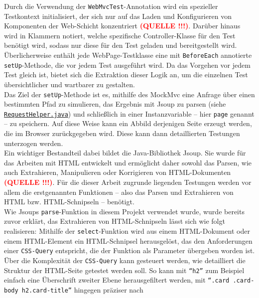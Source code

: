 Durch die Verwendung der \texttt{WebMvcTest}-Annotation wird ein spezieller 
Testkontext initialisiert, der sich nur auf das Laden und Konfigurieren von 
Komponenten der Web-Schicht konzentriert \textbf{\textcolor{red}{(QUELLE !!!)}}. 
Darüber hinaus wird in Klammern notiert, welche spezifische Controller-Klasse für 
den Test benötigt wird, sodass nur diese für den Test geladen und bereitgestellt 
wird. Überlicherweise enthält jede WebPage-Testklasse eine mit \texttt{BeforeEach} 
annotierte \texttt{setUp}-Methode, die vor jedem Test ausgeführt wird. Da das 
Vorgehen vor jedem Test gleich ist, bietet sich die Extraktion dieser Logik an, 
um die einzelnen Test übersichtlicher und wartbarer zu gestalten. \\ 
Das Ziel der \texttt{setUp}-Methode ist es, mithilfe des MockMvc eine Anfrage über 
einen bestimmten Pfad zu simulieren, das Ergebnis mit Jsoup zu parsen (siehe 
\href{https://github.com/FlorianOhmes/bat_spielzeitenplaner/blob/main/spielzeitenplaner/src/test/java/de/bathesis/spielzeitenplaner/utilities/RequestHelper.java}{\texttt{RequestHelper.java}}) und schließlich in einer 
Instanzvariable -- hier \texttt{page} genannt -- zu speichern. Auf diese Weise kann 
ein Abbild derjenigen Seite erzeugt werden, die im Browser zurückgegeben wird. 
Diese kann dann detaillierten Testungen unterzogen werden. \\ 
Ein wichtiger Bestandteil dabei bildet die Java-Bibliothek Jsoup. Sie wurde für das 
Arbeiten mit HTML entwickelt und ermöglicht daher sowohl das Parsen, wie auch 
Extrahieren, Manipulieren oder Korrigieren von HTML-Dokumenten 
\textbf{\textcolor{red}{(QUELLE !!!)}}. Für die dieser Arbeit zugrunde liegenden 
Testungen werden vor allem die erstgenannten Funktionen -- also das Parsen und 
Extrahieren von HTML bzw. HTML-Schnipseln -- benötigt. \\ 
Wie Jsoups \texttt{parse}-Funktion in diesem Projekt verwendet wurde, wurde bereits 
zuvor erklärt, das Extrahieren von HTML-Schnipseln lässt sich wie folgt 
realisieren: Mithilfe der \texttt{select}-Funktion wird aus einem HTML-Dokument 
oder einem HTML-Element ein HTML-Schnipsel herausgelöst, das den Anforderungen 
einer \texttt{CSS-Query} entspricht, die der Funktion als Parameter übergeben 
worden ist. \\ 
Über die Komplexität der \texttt{CSS-Query} kann gesteuert werden, wie 
detailliert die Struktur der HTML-Seite getestet werden soll. So kann mit 
\texttt{``h2''} zum Beispiel einfach eine Überschrift zweiter Ebene herausgefiltert 
werden, mit \texttt{``.card .card-body h2.card-title''} hingegen präziser nach 

